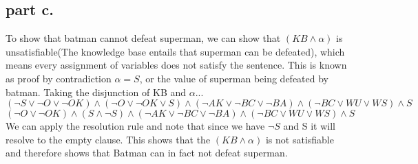 \subsection{part c.}
To show that batman cannot defeat superman, we can show that $(KB \land \alpha)$ is unsatisfiable(The knowledge base entails that superman can be defeated),
which means every assignment of variables does not satisfy the sentence. This is known as proof by contradiction ${\alpha} = S$, or the value of superman
being defeated by batman.
\newpage
Taking the disjunction of KB and $\alpha... $\\
\[
(\neg{S} \lor \neg{O} \lor \neg{OK})  \land (\neg{O} \lor \neg{OK} \lor S)  \land (\neg AK \lor \neg BC \lor \neg BA) \land (\neg BC \lor WU \lor WS) \land S \]
\[(\neg{O} \lor \neg{OK}) \land (S \land \neg{S})  \land (\neg AK \lor \neg BC \lor \neg BA) \land (\neg BC \lor WU \lor WS) \land S 
\]
We can apply the resolution rule and note that since we have $\neg{S}$ and S it will resolve to the empty clause. This shows
that the $(KB \land \alpha)$ is not satisfiable and therefore shows that Batman can in fact not defeat superman.
